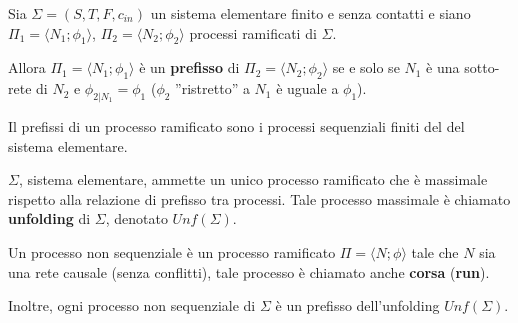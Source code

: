 \begin{definizione}
    Sia $\Sigma = (S,T, F, c_{in})$ un sistema elementare finito e senza contatti
    e siano $\Pi_1 = \langle N_1; \phi_1 \rangle$, $\Pi_2 = \langle N_2; \phi_2 \rangle$
    processi ramificati di $\Sigma$.

    Allora $\Pi_1 = \langle N_1; \phi_1 \rangle$ è un \textbf{prefisso} di
    $\Pi_2 = \langle N_2; \phi_2 \rangle$ se e solo se $N_1$ è una sotto-rete di
    $N_2$ e $\phi_{2|N_1} = \phi_1$ ($\phi_2$ ”ristretto” a $N_1$ è uguale a $\phi_1$).
\end{definizione}
\begin{nota}
    Il prefissi di un processo ramificato sono i processi sequenziali finiti del
    del sistema elementare.
\end{nota}
\begin{definizione}
    $\Sigma$, sistema elementare, ammette un unico processo ramificato che è
    massimale rispetto alla relazione di prefisso tra processi. Tale processo
    massimale è chiamato \textbf{unfolding} di $\Sigma$, denotato $Unf (\Sigma)$.
\end{definizione}
\begin{definizione}
    Un processo non sequenziale è un processo ramificato $\Pi = \langle N; \phi \rangle$
    tale che $N$ sia una rete causale (senza conflitti), tale processo è chiamato
    anche \textbf{corsa} (\textbf{run}).
\end{definizione}
\begin{osservazione}
    Inoltre, ogni processo non sequenziale di $\Sigma$ è un prefisso dell'unfolding
    $Unf (\Sigma)$.
\end{osservazione}

